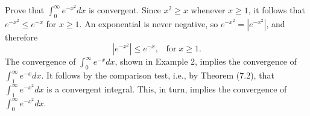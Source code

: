 \begin{example}
Prove that $\int_0^{\infty} e^{-x^2}dx$ is convergent. Since $x^2 \geq x$ whenever $x \geq 1$, it follows that $e^{-x^2} \leq e^{-x}$ for $x \geq 1$. An exponential is never negative, so $e^{-x^2} = |e^{-x^2}|$, and therefore
$$
 |e^{-x^2}| \leq  e^{-x}, \;\;\;\mbox{for}\;    x \geq 1.
$$
The convergence of $\int_0^\infty e^{-x}dx$, shown in Example 2, implies the convergence of $\int_1^\infty e^{-x} dx$. It follows by the comparison test, i.e., by Theorem (7.2), that $\int_1^\infty e^{-x^2}dx$ is a convergent integral. This, in turn, implies the convergence of $\int_0^\infty e^{-x^2} dx$.
\end{example}

\vspace{.2in}

